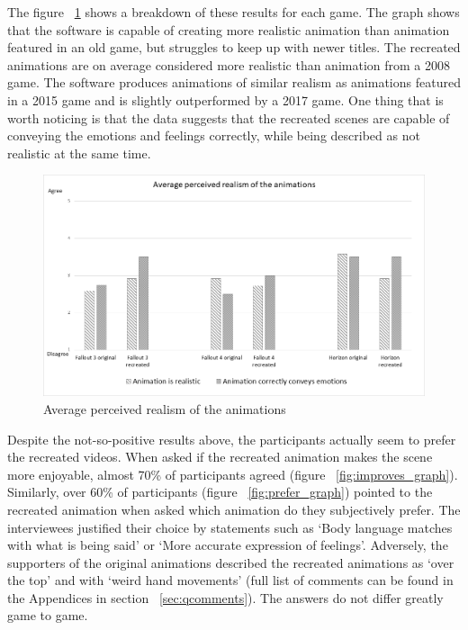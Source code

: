 The figure ~\ref{fig:realism_graph} shows a breakdown of these results for each game. The graph shows that the software is capable of creating more realistic animation than animation featured in an old game, but struggles to keep up with newer titles. The recreated animations are on average considered more realistic than animation from a 2008 game. The software produces animations of similar realism as animations featured in a 2015 game and is slightly outperformed by a 2017 game. One thing that is worth noticing is that the data suggests that the recreated scenes are capable of conveying the emotions and feelings correctly, while being described as not realistic at the same time.

\begin{figure}[!ht]
	\centerline{\includegraphics[width = 42em]{img/results/realism.png}}
	\caption{Average perceived realism of the animations}\label{fig:realism_graph}
\end{figure}



Despite the not-so-positive results above, the participants actually seem to prefer the recreated videos. When asked if the recreated animation makes the scene more enjoyable, almost 70\% of participants agreed (figure ~\ref{fig:improves_graph}). Similarly, over 60\% of participants (figure ~\ref{fig:prefer_graph}) pointed to the recreated animation when asked which animation do they subjectively prefer. The interviewees justified their choice by statements such as `Body language matches with what is being said' or `More accurate expression of feelings'. Adversely, the supporters of the original animations described the recreated animations as `over the top' and with `weird hand movements' (full list of comments can be found in the Appendices in section ~\ref{sec:qcomments}). The answers do not differ greatly game to game.

